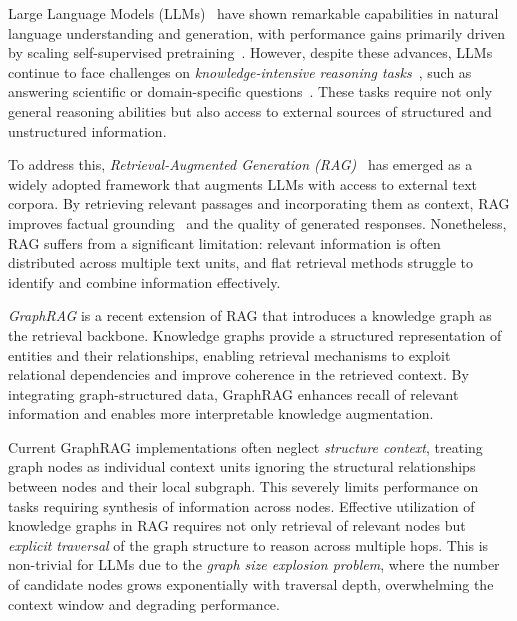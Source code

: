 Large Language Models (LLMs)~\citep{grattafiori2024llama3herdmodels,jiang2024mixtralexperts,yang2025qwen3technicalreport} have shown remarkable capabilities in natural language understanding and generation, with performance gains primarily driven by scaling self-supervised pretraining~\citep{zhao2025surveylargelanguagemodels}. However, despite these advances, LLMs continue to face challenges on \textit{knowledge-intensive reasoning tasks}~\citep{zheng2024clrfactevaluatingcomplexlogical}, such as answering scientific or domain-specific questions~\citep{tonmoy2024comprehensivesurveyhallucinationmitigation}. These tasks require not only general reasoning abilities but also access to external sources of structured and unstructured information.

To address this, \textit{Retrieval-Augmented Generation (RAG)}~\citep{lewis2020retrieval,gao2024retrievalaugmentedgenerationlargelanguage} has emerged as a widely adopted framework that augments LLMs with access to external text corpora. By retrieving relevant passages and incorporating them as context, RAG improves factual grounding~\citep{10.5555/3495724.3496517} and the quality of generated responses. Nonetheless, RAG suffers from a significant limitation: relevant information is often distributed across multiple text units, and flat retrieval methods struggle to identify and combine information effectively.

\textit{GraphRAG} \citep{edge2025localglobalgraphrag,peng2024graphretrievalaugmentedgenerationsurvey,zhang2025surveygraphretrievalaugmentedgeneration} is a recent extension of RAG that introduces a knowledge graph as the retrieval backbone. Knowledge graphs provide a structured representation of entities and their relationships, enabling retrieval mechanisms to exploit relational dependencies and improve coherence in the retrieved context. By integrating graph-structured data, GraphRAG enhances recall of relevant information and enables more interpretable knowledge augmentation. 

Current GraphRAG implementations \citep{jin2024graph, gao2024retrievalaugmentedgenerationlargelanguage, wei2025instructrag} often neglect \textit{structure context}, treating graph nodes as individual context units ignoring the structural relationships between nodes and their local subgraph. This severely limits performance on tasks requiring synthesis of information across nodes.    
Effective utilization of knowledge graphs in RAG requires not only retrieval of relevant nodes but \textit{explicit traversal} of the graph structure to reason across multiple hops. This is non-trivial for LLMs due to the \textit{graph size explosion problem}, where the number of candidate nodes grows exponentially with traversal depth, overwhelming the context window \citep{liu2023lostmiddlelanguagemodels} and degrading performance.



